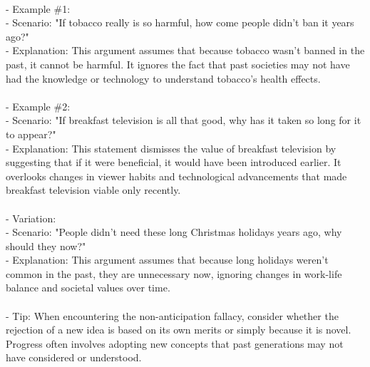 \documentclass[a4paper,12pt,single,pdftex]{scrbook}
\begin{document}
    
      
    \\

    
      - Example \#1:
    \\

    
        - Scenario: "If tobacco really is so harmful, how come people didn’t ban it years ago?"
    \\

    
        - Explanation: This argument assumes that because tobacco wasn't banned in the past, it cannot be harmful. It ignores the fact that past societies may not have had the knowledge or technology to understand tobacco's health effects.
    \\

    
      
    \\

    
      - Example \#2:
    \\

    
        - Scenario: "If breakfast television is all that good, why has it taken so long for it to appear?"
    \\

    
        - Explanation: This statement dismisses the value of breakfast television by suggesting that if it were beneficial, it would have been introduced earlier. It overlooks changes in viewer habits and technological advancements that made breakfast television viable only recently.
    \\

    
      
    \\

    
      - Variation: 
    \\

    
        - Scenario: "People didn’t need these long Christmas holidays years ago, why should they now?"
    \\

    
        - Explanation: This argument assumes that because long holidays weren't common in the past, they are unnecessary now, ignoring changes in work-life balance and societal values over time.
    \\

    
      
    \\

    
      - Tip: When encountering the non-anticipation fallacy, consider whether the rejection of a new idea is based on its own merits or simply because it is novel. Progress often involves adopting new concepts that past generations may not have considered or understood.
    \\
\end{document}
